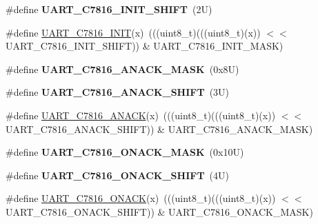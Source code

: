 \begin{DoxyCompactItemize}
\mbox{\label{group___u_a_r_t___register___masks_ga7fe58f80db753fac78feefc4ab257d0d}} 
\#define {\bfseries U\+A\+R\+T\+\_\+\+C7816\+\_\+\+I\+N\+I\+T\+\_\+\+S\+H\+I\+FT}~(2\+U)
\item 
\#define \mbox{\hyperlink{group___u_a_r_t___register___masks_ga5d84e7b71c75740849fcda8982c796b6}{U\+A\+R\+T\+\_\+\+C7816\+\_\+\+I\+N\+IT}}(x)~(((uint8\+\_\+t)(((uint8\+\_\+t)(x)) $<$$<$ U\+A\+R\+T\+\_\+\+C7816\+\_\+\+I\+N\+I\+T\+\_\+\+S\+H\+I\+FT)) \& U\+A\+R\+T\+\_\+\+C7816\+\_\+\+I\+N\+I\+T\+\_\+\+M\+A\+SK)
\item 
\mbox{\label{group___u_a_r_t___register___masks_ga7d492736d5d2ffba794d54fa0d6b8d92}} 
\#define {\bfseries U\+A\+R\+T\+\_\+\+C7816\+\_\+\+A\+N\+A\+C\+K\+\_\+\+M\+A\+SK}~(0x8\+U)
\item 
\mbox{\label{group___u_a_r_t___register___masks_gae5c391d165239e4ed2d80e7ac31a0232}} 
\#define {\bfseries U\+A\+R\+T\+\_\+\+C7816\+\_\+\+A\+N\+A\+C\+K\+\_\+\+S\+H\+I\+FT}~(3\+U)
\item 
\#define \mbox{\hyperlink{group___u_a_r_t___register___masks_ga4bfeb7fd58add67276f19313c42f1d1c}{U\+A\+R\+T\+\_\+\+C7816\+\_\+\+A\+N\+A\+CK}}(x)~(((uint8\+\_\+t)(((uint8\+\_\+t)(x)) $<$$<$ U\+A\+R\+T\+\_\+\+C7816\+\_\+\+A\+N\+A\+C\+K\+\_\+\+S\+H\+I\+FT)) \& U\+A\+R\+T\+\_\+\+C7816\+\_\+\+A\+N\+A\+C\+K\+\_\+\+M\+A\+SK)
\item 
\mbox{\label{group___u_a_r_t___register___masks_ga031dcabb12ed66e1a74a735e962c0418}} 
\#define {\bfseries U\+A\+R\+T\+\_\+\+C7816\+\_\+\+O\+N\+A\+C\+K\+\_\+\+M\+A\+SK}~(0x10\+U)
\item 
\mbox{\label{group___u_a_r_t___register___masks_ga969b1c4c1e85e7745b73b993b93b4c6f}} 
\#define {\bfseries U\+A\+R\+T\+\_\+\+C7816\+\_\+\+O\+N\+A\+C\+K\+\_\+\+S\+H\+I\+FT}~(4\+U)
\item 
\#define \mbox{\hyperlink{group___u_a_r_t___register___masks_ga200b02f63886684317bac797dae1e51f}{U\+A\+R\+T\+\_\+\+C7816\+\_\+\+O\+N\+A\+CK}}(x)~(((uint8\+\_\+t)(((uint8\+\_\+t)(x)) $<$$<$ U\+A\+R\+T\+\_\+\+C7816\+\_\+\+O\+N\+A\+C\+K\+\_\+\+S\+H\+I\+FT)) \& U\+A\+R\+T\+\_\+\+C7816\+\_\+\+O\+N\+A\+C\+K\+\_\+\+M\+A\+SK)
\end{DoxyCompactItemize}
